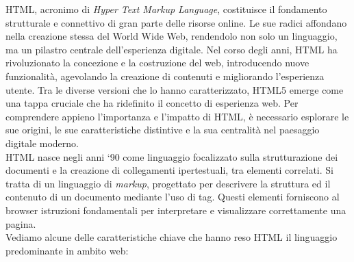 HTML, acronimo di \textit{Hyper Text Markup Language}, costituisce il fondamento strutturale e connettivo di gran parte delle risorse online.\cite{HTML_kinsta} Le sue radici affondano nella creazione stessa del World Wide Web, rendendolo non solo un linguaggio, ma un pilastro centrale dell'esperienza digitale. Nel corso degli anni, HTML ha rivoluzionato la concezione e la costruzione del web, introducendo nuove funzionalità, agevolando la creazione di contenuti e migliorando l'esperienza utente. Tra le diverse versioni che lo hanno caratterizzato, HTML5 emerge come una tappa cruciale che ha ridefinito il concetto di esperienza web. Per comprendere appieno l’importanza e l’impatto di HTML, è necessario esplorare le sue origini, le sue caratteristiche distintive e la sua centralità nel paesaggio digitale moderno.\\
HTML nasce negli anni ‘90 come linguaggio focalizzato sulla strutturazione dei documenti e la creazione di collegamenti ipertestuali, tra elementi correlati. Si tratta di un linguaggio di \textit{markup}, progettato per descrivere la struttura ed il contenuto di un documento mediante l’uso di tag. Questi elementi forniscono al browser istruzioni fondamentali per interpretare e visualizzare correttamente una pagina.\cite{HTML_geekandjob}\\
Vediamo alcune delle caratteristiche chiave che hanno reso HTML il linguaggio predominante in ambito web:
